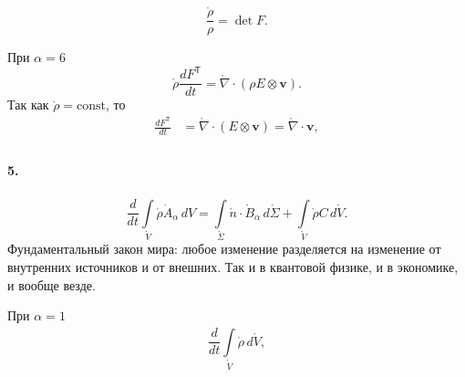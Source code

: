 \[
    \boxed{
    \frac{\mathring{\rho}}{\rho} = \det F.}
\]


При $ \alpha = 6 $  
\[
  \mathring{\rho} \frac{dF^{\mathsf T}}{dt} = \mathring{\nabla}\cdot (\rho E
  \otimes \mathbf{v}).
\]
Так как $ \mathring{\rho} = \mathrm{const} $, то  
\begin{align*}
  \frac{dF^{\mathsf T}}{dt} &= \mathring{\nabla} \cdot (E \otimes \mathbf{v}) =
  \mathring{\nabla} \cdot \mathbf{v},\\
\end{align*}


\paragraph{5.}

 
\[
  \frac{d}{dt} \int\limits_{\mathring{V}}^{}\mathring{\rho}
  \mathring{A}_\alpha\,dV = \int\limits_{\mathring\Sigma}^{}\mathring n\cdot
  \mathring{B}_\alpha\,d\mathring{\Sigma} +
  \int\limits_{\mathring{V}}^{}\mathring{\rho} C\,d\mathring V.
\]
Фундаментальный закон мира: любое изменение разделяется на изменение от
внутренних источников и от внешних. Так и в квантовой физике, и в экономике, и
вообще везде.


При $ \alpha = 1 $  
\[
  \frac{d}{dt} \int\limits_{\mathring{V}}^{}\mathring{\rho}\,d\mathring{V},
\]

